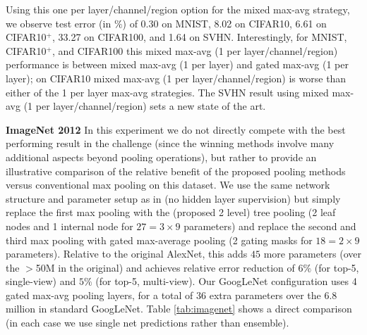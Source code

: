 \documentclass[twoside]{article}
\begin{document}
\vspace{-.5mm}
Using this one per layer/channel/region option for the mixed 
max-avg strategy, we observe test error (in $\%$) of 0.30 on MNIST, 8.02 on CIFAR10, 
6.61 on CIFAR10$^+$, 33.27 on CIFAR100, and 1.64 on SVHN. Interestingly, 
for MNIST, CIFAR10$^+$, and CIFAR100 this mixed max-avg (1 per layer/channel/region)
performance is between mixed max-avg (1 per layer) and gated max-avg (1 per layer); 
on CIFAR10 mixed max-avg (1 per layer/channel/region) is worse than either of the 
1 per layer max-avg strategies.  The SVHN result using mixed max-avg 
(1 per layer/channel/region) sets a new state of the art. 

\vspace{-.5mm}
\textbf{ImageNet 2012}
In this experiment we do not directly compete with the best performing result in
the challenge (since the winning methods \cite{szegedy2014going} involve many 
additional aspects beyond pooling operations), but rather to provide an illustrative comparison of the relative 
benefit of the proposed pooling methods versus conventional max pooling on this
dataset. We use the same network structure and parameter setup as in \cite{krizhevsky2012imagenet}
(no hidden layer supervision)  but simply replace the first max pooling with the (proposed 2 level) tree pooling 
(2 leaf nodes and 1 internal node for $27=3\times9$ parameters) and replace the second and third max pooling with gated
max-average pooling (2 gating masks for $18=2\times9$ parameters). Relative to the original AlexNet,
this adds $45$ more parameters (over the $>$50M in the original) and achieves relative 
error reduction of $6\%$ (for top-5, single-view) and  $5\%$ (for top-5, multi-view). Our GoogLeNet 
configuration uses 4 gated max-avg pooling layers, for a total of 36 extra parameters over 
the 6.8 million in standard GoogLeNet.
Table \ref{tab:imagenet} shows a direct comparison (in each case we use single 
net predictions rather than ensemble).  
\end{document}
